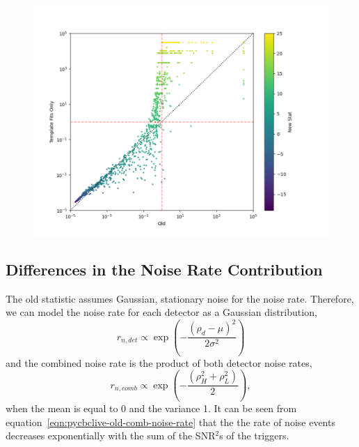 \begin{figure}
\begin{minipage}[t]{1.0\linewidth}
    \includegraphics[width=1\textwidth]{images/pycbclive/ifar_vs_ifar_new_stat.png}
    \caption{}
    \label{fig:pycbclive-ifar-ifar-new-stat}
  
  \end{minipage}
\end{figure}
%



\subsection{\label{sec:pycbclive-noise-contrib}Differences in the Noise Rate Contribution}


The old statistic assumes Gaussian, stationary noise for the noise rate. Therefore, we can model the noise rate for each detector as a Gaussian distribution,
%
\begin{equation}
    r_{n,det} \propto \exp \left( -\frac{(\rho_d - \mu)^2}{2 \sigma^2} \right)
    \label{eqn:pycbclive-old-noise-rate}
\end{equation}
%
and the combined noise rate is the product of both detector noise rates,
%
\begin{equation}
    r_{n,comb} \propto \exp \left( -\frac{(\rho_{H}^{2} + \rho_{L}^{2})}{2} \right) ,
    \label{eqn:pycbclive-old-comb-noise-rate}
\end{equation}
%
when the mean is equal to 0 and the variance 1. It can be seen from equation~\ref{eqn:pycbclive-old-comb-noise-rate} that the the rate of noise events decreases exponentially with the sum of the SNR$^{2}$s of the triggers.

